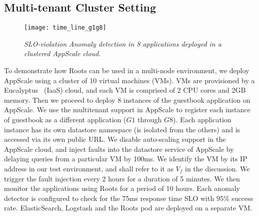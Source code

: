 
\subsection{Multi-tenant Cluster Setting}

\begin{figure}
\centering
\texttt{[image: time\_line\_g1g8]}
\vspace{-0.3in}
\caption{\textit{SLO-violation Anomaly detection in 8 applications deployed in
a clustered AppScale cloud.}}
\vspace{-0.2in}
\label{fig:time_line_g1g8}
\end{figure}

To demonstrate how Roots can be used in a multi-node environment, we deploy AppScale
using a cluster of 10 virtual machines (VMs). VMs are provisioned by a
Eucalyptus~\cite{eucalyptus09} (IaaS)
cloud, and each VM is comprised of 2 CPU cores and 2GB memory. Then we proceed
to deploy 8 instances of the guestbook application on AppScale. We use the multitenant support
in AppScale to register each instance of guestbook as a different application ($G1$ through $G8$). 
Each application instance has its own datastore namespace (is isolated from the others) 
and is accessed via its own public URL. We disable auto-scaling support in 
the AppScale cloud, and inject faults into the datastore service of AppScale by delaying queries from a particular
VM by 100ms.
We identify the VM by its IP address
in our test environment, and shall refer to it as $V_f$ in the discussion. We trigger
the fault injection every 2 hours for a duration of 5 minutes. We then monitor
the applications using Roots for a period of 10 hours. Each anomaly detector is configured
to check for the 75ms response time SLO with 95\% success rate. 
ElasticSearch, Logstash and the Roots pod are deployed on a separate VM. 

